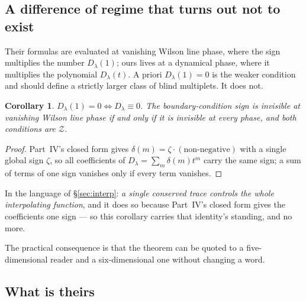\documentclass[11pt,a4paper]{article}
\newtheorem{corollary}{Corollary}
\newcommand{\Dl}{D_\lambda}
\begin{document}
\subsection*{A difference of regime that turns out not to exist}

Their formulas are evaluated at vanishing Wilson line phase, where the sign multiplies the number
$\Dl(1)$; ours lives at a dynamical phase, where it multiplies the polynomial $\Dl(t)$. A priori
$\Dl(1)=0$ is the weaker condition and should define a strictly larger class of blind multiplets. It
does not.

\begin{corollary}\label{cor:regime}
$\Dl(1)=0\iff\Dl\equiv0$. The boundary-condition sign is invisible at vanishing Wilson line phase if
and only if it is invisible at every phase, and both conditions are $\mathcal Z$.
\end{corollary}

\begin{proof}
Part~IV's closed form gives $\delta(m)=\zeta\cdot(\text{non-negative})$ with a single global sign
$\zeta$, so all coefficients of $\Dl=\sum_m\delta(m)t^m$ carry the same sign; a sum of terms of one
sign vanishes only if every term vanishes.
\end{proof}

\noindent In the language of \S\ref{sec:interp}: \emph{a single conserved trace controls the whole
interpolating function}, and it does so because Part~IV's closed form gives the coefficients one
sign --- so this corollary carries that identity's standing, and no more.

\noindent [Verified over the $455$ irreducibles in range: $0$ have coefficients of both signs;
$\Dl(1)=0$ on $47$ and $\Dl\equiv0$ on the same $47$, with $0$ in either class and not the other.]

The practical consequence is that the theorem can be quoted to a five-dimensional reader and a
six-dimensional one without changing a word.

\subsection*{What is theirs}
\end{document}
